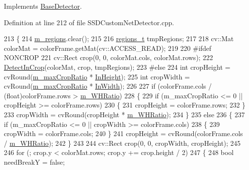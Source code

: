 Implements \mbox{\hyperlink{class_base_detector_a9c9dedfffb7673fd2995f24bdb9ade18}{Base\+Detector}}.



Definition at line 212 of file S\+S\+D\+Custom\+Net\+Detector.\+cpp.


\begin{DoxyCode}
213 \{
214     \mbox{\hyperlink{class_base_detector_a409c20093acba261db8354ca72058fce}{m\_regions}}.clear();
215 
216     \mbox{\hyperlink{defines_8h_a01db0de56a20f4342820a093c5154536}{regions\_t}} tmpRegions;
217 
218     cv::Mat colorMat = colorFrame.getMat(cv::ACCESS\_READ);
219 
220 \textcolor{preprocessor}{#ifdef NONCROP}
221     cv::Rect crop(0, 0, colorMat.cols, colorMat.rows);
222     \mbox{\hyperlink{class_s_s_d_custom_net_detector_a9e87debb1ee3634724914830d6c2079d}{DetectInCrop}}(colorMat, crop, tmpRegions);
223 \textcolor{preprocessor}{#else}
224     \textcolor{keywordtype}{int} cropHeight = cvRound(\mbox{\hyperlink{class_s_s_d_custom_net_detector_a41f65cc3327a94be76280cb2ad7f46f8}{m\_maxCropRatio}} * \mbox{\hyperlink{class_s_s_d_custom_net_detector_ad1f675644d34cba9e15b9ae47a51bd53}{InHeight}});
225     \textcolor{keywordtype}{int} cropWidth = cvRound(\mbox{\hyperlink{class_s_s_d_custom_net_detector_a41f65cc3327a94be76280cb2ad7f46f8}{m\_maxCropRatio}} * \mbox{\hyperlink{class_s_s_d_custom_net_detector_aa40596238aee8ed737f132d5f842d65d}{InWidth}});
226 
227     \textcolor{keywordflow}{if} (colorFrame.cols / (\textcolor{keywordtype}{float})colorFrame.rows > \mbox{\hyperlink{class_s_s_d_custom_net_detector_a31c168d1239dfd0c485afeea9a88a2e9}{m\_WHRatio}})
228     \{
229         \textcolor{keywordflow}{if} (m\_maxCropRatio <= 0 || cropHeight >= colorFrame.rows)
230         \{
231             cropHeight = colorFrame.rows;
232         \}
233         cropWidth = cvRound(cropHeight * \mbox{\hyperlink{class_s_s_d_custom_net_detector_a31c168d1239dfd0c485afeea9a88a2e9}{m\_WHRatio}});
234     \}
235     \textcolor{keywordflow}{else}
236     \{
237         \textcolor{keywordflow}{if} (m\_maxCropRatio <= 0 || cropWidth >= colorFrame.cols)
238         \{
239             cropWidth = colorFrame.cols;
240         \}
241         cropHeight = cvRound(colorFrame.cols / \mbox{\hyperlink{class_s_s_d_custom_net_detector_a31c168d1239dfd0c485afeea9a88a2e9}{m\_WHRatio}});
242     \}
243 
244     cv::Rect crop(0, 0, cropWidth, cropHeight);
245 
246     \textcolor{keywordflow}{for} (; crop.y < colorMat.rows; crop.y += crop.height / 2)
247     \{
248         \textcolor{keywordtype}{bool} needBreakY = \textcolor{keyword}{false};

\end{DoxyCode}
